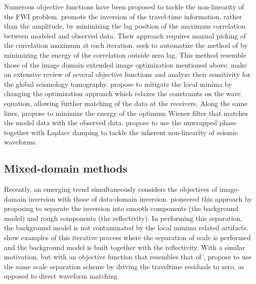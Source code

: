 Numerous objective functions have been proposed to tackle the non-linearity of the
FWI problem.
 \cite{Luo91} promote the inversion of the travel-time information, rather
than the amplitude, by minimizing the lag position of the maximum correlation between
modeled and observed data. Their approach requires manual picking of the correlation maximum
at each iteration. \cite{van2010correlation} seek to automatize the method of \citep{Luo91} 
by minimizing the energy of the correlation outside zero lag. This method resemble those 
of the image domain extended image optimization mentioned above.
\cite{GJI:GJI4970} make
an extensive review of several objective functions and analyze their sensitivity 
for the global seismology tomography. 
\cite{van2013mitigating} propose to mitigate the local
minima by changing the optimization
approach which relaxes the constraints on the wave equation, allowing further matching of the data
at the receivers. Along the same lines, 
\cite{simon,warner} propose to minimize the energy of the optimum Wiener filter that
matches the model data with the observed data. 
 \cite{ChoiTariq} propose to use the unwrapped phase together with 
Laplace damping to tackle the inherent non-linearity of seismic waveforms. 


\subsection{Mixed-domain methods}

Recently, an emerging trend simultaneously considers the objectives
of image-domain inversion  with those of data-domain inversion. \cite{clement} 
 pioneered  this approach by proposing to separate the inversion into smooth 
components (the background model) and rough components (the reflectivity). In performing
this separation, the background model is not contaminated by the local minima related artifacts. 
 \cite{Xu,HWang,Zhou01092015,Zedong} show examples of this iterative process where 
the separation of scale is performed and the background model is built together with the
reflectivity. With a similar motivation, but with an objective function that resembles that of \cite{Luo91},
 \cite{MaWarping} propose to use the same scale separation scheme by driving 
the traveltime residuals to zero, as opposed to direct waveform matching. 
 
